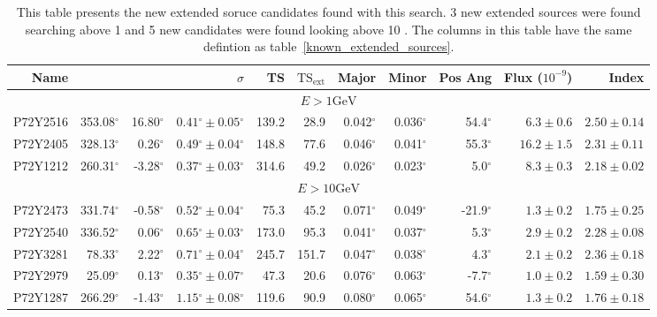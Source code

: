 \documentclass[preprint]{aastex}
\newcommand{\gev}{\text{GeV}\xspace}
\newcommand{\tsext}{{\ensuremath{\text{TS}_\text{ext}}}\xspace}
\newcommand{\glon}{\text{GLON}\xspace}
\newcommand{\glat}{\text{GLAT}\xspace}
\renewcommand{\deg}{\ensuremath{^\circ}\xspace}
\begin{document}
\clearpage
\begin{table}
  \begin{centering}
    \begin{tabular}{r|rrrrrrrrrr}
      \hline
      \hline
      Name                 &          \glon &          \glat &                    $\sigma$ &       TS &   $\tsext$ &      Major &      Minor &    Pos Ang &      Flux ($10^{-9}$) &                 Index \\
      \hline
      \multicolumn{11}{c}{$E > 1\gev$} \\
      \hline
      P72Y2516             &     353.08\deg &      16.80\deg & $  0.41\deg \pm   0.05\deg$ &    139.2 &       28.9 &  0.042\deg &  0.036\deg &   54.4\deg & $    6.3 \pm     0.6$ & $   2.50 \pm    0.14$ \\
      P72Y2405             &     328.13\deg &       0.26\deg & $  0.49\deg \pm   0.04\deg$ &    148.8 &       77.6 &  0.046\deg &  0.041\deg &   55.3\deg & $   16.2 \pm     1.5$ & $   2.31 \pm    0.11$ \\
      P72Y1212             &     260.31\deg &      -3.28\deg & $  0.37\deg \pm   0.03\deg$ &    314.6 &       49.2 &  0.026\deg &  0.023\deg &    5.0\deg & $    8.3 \pm     0.3$ & $   2.18 \pm    0.02$ \\
      \hline
      \multicolumn{11}{c}{$E > 10\gev$} \\
      \hline
      P72Y2473             &     331.74\deg &      -0.58\deg & $  0.52\deg \pm   0.04\deg$ &     75.3 &       45.2 &  0.071\deg &  0.049\deg &  -21.9\deg & $    1.3 \pm     0.2$ & $   1.75 \pm    0.25$ \\
      P72Y2540             &     336.52\deg &       0.06\deg & $  0.65\deg \pm   0.03\deg$ &    173.0 &       95.3 &  0.041\deg &  0.037\deg &    5.3\deg & $    2.9 \pm     0.2$ & $   2.28 \pm    0.08$ \\
      P72Y3281             &      78.33\deg &       2.22\deg & $  0.71\deg \pm   0.04\deg$ &    245.7 &      151.7 &  0.047\deg &  0.038\deg &    4.3\deg & $    2.1 \pm     0.2$ & $   2.36 \pm    0.18$ \\
      P72Y2979             &      25.09\deg &       0.13\deg & $  0.35\deg \pm   0.07\deg$ &     47.3 &       20.6 &  0.076\deg &  0.063\deg &   -7.7\deg & $    1.0 \pm     0.2$ & $   1.59 \pm    0.30$ \\
      P72Y1287             &     266.29\deg &      -1.43\deg & $  1.15\deg \pm   0.08\deg$ &    119.6 &       90.9 &  0.080\deg &  0.065\deg &   54.6\deg & $    1.3 \pm     0.2$ & $   1.76 \pm    0.18$ \\
      \hline
    \end{tabular}
    \caption{This table presents the new extended soruce candidates found with
    this search. 3 new extended sources were found searching above 1 \gev and
    5 new candidates were found looking above 10 \gev.
    The columns in this table have the same defintion as table~\ref{known_extended_sources}.}
    \label{new_ext_srcs}
  \end{centering}
\end{table}
\end{document}
